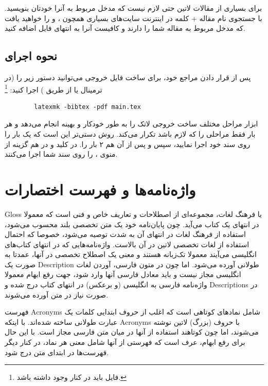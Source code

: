 برای بسیاری از مقالات لاتین حتی لازم نیست که مدخل مربوط به آنرا خودتان بنویسید. با جستجوی
نام مقاله + کلمه
در اینترنت سایت‌های بسیاری همچون
،  و 
را خواهید یافت که مدخل
مربوط به مقاله شما را دارند و کافیست آنرا به انتهای فایل
اضافه کنید.

\subsection{نحوه اجرای \texorpdfstring{}{Bib\TeX}}
پس از قرار دادن مراجع خود، برای ساخت فایل خروجی می‌توانید دستور زیر را (در ترمینال یا از طریق ) اجرا کنید:%
\footnote{فایل  باید در کنار  وجود داشته باشد.}

\singlespacing
\begin{LTR}
	\begin{verbatim}
		latexmk -bibtex -pdf main.tex
	\end{verbatim}
\end{LTR}
\doublespacing
ابزار  مراحل مختلف ساخت خروجی لاتک را به طور خودکار و بهینه انجام می‌دهد و هر بار فقط مراحلی را که لازم باشد تکرار می‌کند.
روش دستی‌تر این است که یک بار  را روی سند خود اجرا نمایید، سپس  و پس از آن هم ۲ بار  را. در  کلید  و در  هم گزینه  از منوی ،  را روی سند شما اجرا می‌کنند.

\section{واژه‌نامه‌ها و فهرست اختصارات}
\gls{Gloss}
یا فرهنگ لغات، مجموعه‌ای از اصطلاحات و تعاریف خاص و فنی است که معمولا در انتهای یک کتاب می‌آید. چون پایان‌نامه خود یک متن تخصصی بلند محسوب می‌شود، استفاده از فرهنگ لغات در انتهای آن به شدت توصیه می‌شود، خصوصا که احتمال استفاده از لغات تخصصی لاتین در آن بالاست.
واژه‌نامه‌هایی که در انتهای کتاب‌های انگلیسی می‌آیند معمولا تک‌زبانه هستند و معنی یک اصطلاح تخصصی در آنها، عمدتا به صورت یک
\gls{Description}
طولانی آورده می‌شود. اما چون در متون فارسی، آوردن لغات انگلیسی مجاز نیست و باید معادل فارسی آنها وارد شود، جهت رفع ابهام معمولا واژه‌نامه فارسی به انگلیسی (و برعکس) در انتهای کتاب درج شده و
\glspl{Description}
در صورت نیاز در متن آورده می‌شوند.

فهرست
\glspl{Acronym}
شامل نمادهای کوتاهی است که اغلب از حروف ابتدایی کلمات یک عبارت طولانی ساخته شده‌اند. با اینکه
\glspl{Acronym}
با حروف (بزرگ) لاتین نوشته می‌شوند، اما چون کوتاهند استفاده از آنها در میان متن فارسی مجاز است. با این حال برای رفع ابهام، عرف است که فهرستی از آنها شامل معنی هر نماد، در کنار دیگر فهرست‌ها در ابتدای متن درج شود.


